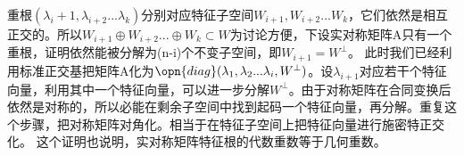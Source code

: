 重根$(\lambda_i+1,\lambda_{i+2}...\lambda_k)$分别对应特征子空间$W_{i+1},W_{i+2}...W_k$，它们依然是相互正交的。所以$W_{i+1}\oplus W_{i+2}...\oplus W_k\subset W$为讨论方便，下设实对称矩阵A只有一个重根，证明依然能被分解为(n-i)个不变子空间，即$W_{i+1}=W^{\perp}$。
此时我们已经利用标准正交基把矩阵A化为$\opn {diag}(\lambda_1,\lambda_2...\lambda_i,W^{\perp})$。设$\lambda_{i+1}$对应若干个特征向量，利用其中一个特征向量，可以进一步分解$W^{\perp}$。由于对称矩阵在合同变换后依然是对称的，所以必能在剩余子空间中找到起码一个特征向量，再分解。重复这个步骤，把对称矩阵对角化。相当于在特征子空间上把特征向量进行施密特正交化。
这个证明也说明，实对称矩阵特征根的代数重数等于几何重数。